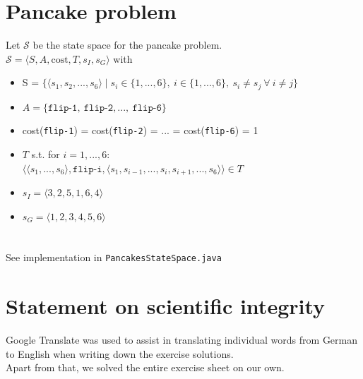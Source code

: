 \documentclass{article} %
\begin{document}
\section{Pancake problem}
Let $\mathcal{S}$ be the state space for the pancake problem.\\
$\mathcal{S} = \langle S, A, \text{cost}, T, s_I, s_G \rangle$ with
\begin{itemize}
    \item S = $ \{ \langle s_1, s_2, ..., s_6 \rangle \mid 
    s_i \in \{ 1, ..., 6 \}, \ i \in \{1, ..., 6 \}, \
    s_i \neq s_j \ \forall \ i \neq j \}$
    \item $A = \{ \texttt{flip-1}, \ \texttt{flip-2}, ..., \ \texttt{flip-6} \}$
    \item cost(\texttt{flip-1}) = cost(\texttt{flip-2}) = ... =
    cost(\texttt{flip-6}) = 1
    \item $T$ s.t. for $i = 1, ..., 6$:\\
        $\langle
        \langle s_1, ..., s_6 \rangle,
        \texttt{flip-i},
        \langle s_1, s_{i-1}, ..., s_i, s_{i+1}, ..., s_6 \rangle
        \rangle
        \in T$
    \item $s_I = \langle 3, 2, 5, 1, 6, 4 \rangle$
    \item $s_G = \langle 1, 2, 3, 4, 5, 6 \rangle$
\end{itemize}

\section{}
See implementation in \texttt{PancakesStateSpace.java}

\section*{Statement on scientific integrity}
Google Translate was used to assist in translating individual words from
German to English when writing down the exercise solutions.\\
Apart from that, we solved the entire exercise sheet on our own. 
\end{document}
